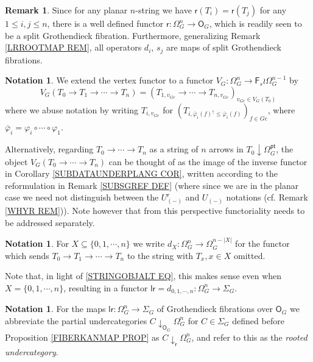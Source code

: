 \documentclass[a4paper,10pt
,draft
]{article}%
\numberwithin{equation}{section}
\numberwithin{figure}{section}
\theoremstyle{definition} %
\newtheorem{remark}[equation]{Remark}%
\newtheorem{notation}[equation]{Notation}%
\newcommand{\Fin}{\mathsf{F}}%
\newcommand{\1}{\ensuremath{\mathbbm 1}}%
\begin{document}
\begin{remark}\label{ALLSPLITMAPS REM}
Since for any planar $n$-string we have 
$\mathsf{r}(T_i) = \mathsf{r}(T_j)$
for any $1 \leq i,j \leq n$, 
there is a well defined functor
$\mathsf{r} \colon \Omega_{G}^{n} \to \mathsf{O}_G$,
which is readily seen to be a split Grothendieck fibration.
Furthermore, generalizing Remark \ref{LRROOTMAP REM},
all operators $d_i$, $s_j$ 
are maps of split Grothendieck fibrations.
\end{remark}



\begin{notation}\label{VGDEF NOT}
We extend the vertex functor to a functor 
$V_G \colon \Omega_{G}^{n} \to \Fin_s \wr \Omega_{G}^{n-1}$
by
\begin{equation}\label{VGDEF EQ}
	V_G(T_0 \to T_1 \to \cdots \to T_n) = 
	(T_{1,v_{Ge}} \to \cdots \to
	T_{n,v_{Ge}})_{v_{Ge} \in V_G(T_0)}	
\end{equation}
where we abuse notation by writing $T_{i,v_{Ge}}$
for 
$(T_{i,\bar{\varphi}_i(f)^{\uparrow}\leq \bar{\varphi}_i(f)})_{f \in Ge}$, where 
$\bar{\varphi}_i = \varphi_i \circ \cdots \circ \varphi_1$.

Alternatively, regarding $T_0 \to \cdots \to T_n$ as a string of $n$ arrows in $T_0 \downarrow \Omega_G^{\mathsf{pt}}$, 
the object $V_G(T_0 \to \cdots \to T_n)$
can be thought of as the image of the inverse functor in
Corollary \ref{SUBDATAUNDERPLANG COR},
written according to the reformulation in 
Remark \ref{SUBSGREF DEF}
(where since we are in the planar case we need not distinguish between the
$U_{(\minus)}^{\mathsf{r}}$ and $U_{(\minus)}$ notations
(cf. Remark \ref{WHYR REM})).
Note however that from this perspective
functoriality needs to be addressed separately.
\end{notation}


\begin{notation}\label{DDDDD NOT}
	For $X \subseteq \{0,1,\cdots,n\}$
	we write
	$d_X \colon \Omega^n_G \to \Omega^{n-|X|}_G$
	for the functor which sends 
	$T_0 \to T_1 \to \cdots \to T_n$
	to the string with $T_x, x\in X$ omitted.
	
	Note that, in light of \eqref{STRINGOBJALT EQ},
	this makes sense even when
	$X = \{0,1,\cdots,n\}$,
	resulting in a functor
	$\mathsf{lr} = d_{0,1,\cdots,n}
	\colon \Omega_G^n \to \Sigma_G$.
\end{notation}



\begin{notation}\label{ROOTUNDER NOT}
	For the maps 
	$\mathsf{lr} \colon \Omega_G^n \to \Sigma_G$
	of Grothendieck fibrations over $\mathsf{O}_G$
	we abbreviate the partial undercategories
	$C \downarrow_{\mathsf{O}_G} \Omega^n_G$
	for $C \in \Sigma_G$
	defined before Proposition \ref{FIBERKANMAP PROP}
	as $C \downarrow_{\mathsf{r}} \Omega^n_G$,
	and refer to this as the \emph{rooted undercategory}.
\end{notation}
\end{document}
